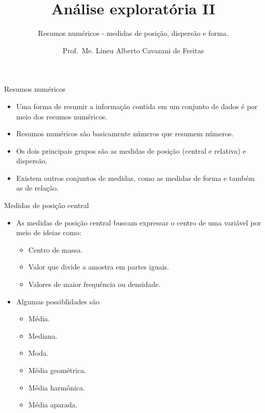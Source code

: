\documentclass[
  ignorenonframetext,
  serif,
  professionalfont,
  usenames,
  dvipsnames,
  aspectratio = 169]{beamer}
\title{\textbf{Análise exploratória II}}
\subtitle{Resumos numéricos - medidas de posição, dispersão e forma.}
\author{Prof.~Me. Lineu Alberto Cavazani de Freitas}
\date{}
\institute{\textbf{CE003 – Estatística II}\\
\strut \\
Departamento de Estatística\\
Laboratório de Estatística e Geoinformação}
\providecommand{\tightlist}{%
  \setlength{\itemsep}{0pt}\setlength{\parskip}{0pt}}
\renewcommand{\tightlist}{%
  \setlength{\itemsep}{0\baselineskip}
  \setlength{\parskip}{0.25\baselineskip}
}
\begin{document}
\frame{\titlepage}

\begin{frame}{Resumos numéricos}
\protect\hypertarget{resumos-numuxe9ricos}{}
\begin{itemize}
\item
  Uma forma de resumir a informação contida em um conjunto de dados é
  por meio dos resumos numéricos.
\item
  Resumos numéricos são basicamente números que resumem números.
\item
  Os dois principais grupos são as medidas de posição (central e
  relativa) e dispersão.
\item
  Existem outros conjuntos de medidas, como as medidas de forma e também
  as de relação.
\end{itemize}
\end{frame}

\begin{frame}{Medidas de posição central}
\protect\hypertarget{medidas-de-posiuxe7uxe3o-central}{}
\begin{itemize}
\tightlist
\item
  As medidas de posição central buscam expressar o centro de uma
  variável por meio de ideias como:

  \begin{itemize}
  \tightlist
  \item
    Centro de massa.
  \item
    Valor que divide a amostra em partes iguais.
  \item
    Valores de maior frequência ou densidade.
  \end{itemize}
\item
  Algumas possiblidades são

  \begin{itemize}
  \tightlist
  \item
    Média.
  \item
    Mediana.
  \item
    Moda.
  \item
    Média geométrica.
  \item
    Média harmônica.
  \item
    Média aparada.
  \end{itemize}
\end{itemize}
\end{frame}
\end{document}
